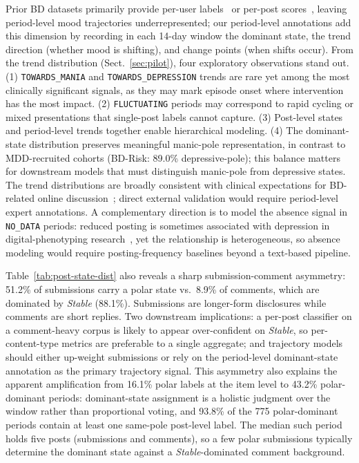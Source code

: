 \documentclass[runningheads]{llncs}
\begin{document}
Prior BD datasets primarily provide per-user labels~\cite{cohan2018smhd,sekulic2018not} or per-post scores~\cite{lee2024detecting}, leaving period-level mood trajectories underrepresented; our period-level annotations add this dimension by recording in each 14-day window the dominant state, the trend direction (whether mood is shifting), and change points (when shifts occur). From the trend distribution (Sect.~\ref{sec:pilot}), four exploratory observations stand out. (1) \texttt{TOWARDS\_MANIA} and \texttt{TOWARDS\_DEPRESSION} trends are rare yet among the most clinically significant signals, as they may mark episode onset where intervention has the most impact. (2) \texttt{FLUCTUATING} periods may correspond to rapid cycling or mixed presentations that single-post labels cannot capture. (3) Post-level states and period-level trends together enable hierarchical modeling. (4) The dominant-state distribution preserves meaningful manic-pole representation, in contrast to MDD-recruited cohorts (BD-Risk:  89.0\% depressive-pole); this balance matters for downstream models that must distinguish manic-pole from depressive states. The trend distributions are broadly consistent with clinical expectations for BD-related online discussion~\cite{apa2013dsm5,grande2016bipolar}; direct external validation would require period-level expert annotations. A complementary direction is to model the absence signal in \texttt{NO\_DATA} periods: reduced posting is sometimes associated with depression in digital-phenotyping research~\cite{faurholt2018smartphone}, yet the relationship is heterogeneous, so absence modeling would require posting-frequency baselines beyond a text-based pipeline.

Table~\ref{tab:post-state-dist} also reveals a sharp  submission-comment asymmetry: 51.2\% of submissions carry a polar state vs.~8.9\% of comments, which are dominated by \emph{Stable} (88.1\%). Submissions are longer-form disclosures while comments are short replies. Two downstream implications: a per-post classifier on a comment-heavy corpus is likely to appear over-confident on \emph{Stable}, so per-content-type metrics are preferable to a single aggregate; and trajectory models should either up-weight submissions or rely on the period-level dominant-state annotation as the primary trajectory signal. This asymmetry also explains the apparent amplification from 16.1\% polar labels at the item level to 43.2\% polar-dominant periods: dominant-state assignment is a holistic judgment over the window rather than proportional voting, and 93.8\% of the 775 polar-dominant periods contain at least one same-pole post-level label. The median such period holds five posts (submissions and comments), so a few polar submissions typically determine the dominant state against a \emph{Stable}-dominated comment background.
\end{document}
